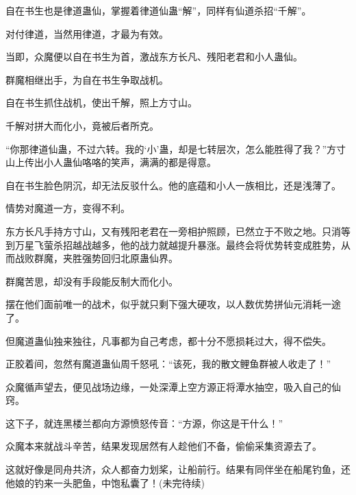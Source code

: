 \begin{this_body}
自在书生也是律道蛊仙，掌握着律道仙蛊“解”，同样有仙道杀招“千解”。

对付律道，当然用律道，才最为有效。

当即，众魔便以自在书生为首，激战东方长凡、残阳老君和小人蛊仙。

群魔相继出手，为自在书生争取战机。

自在书生抓住战机，使出千解，照上方寸山。

千解对拼大而化小，竟被后者所克。

“你那律道仙蛊，不过六转。我的‘小’蛊，却是七转层次，怎么能胜得了我？”方寸山上传出小人蛊仙咯咯的笑声，满满的都是得意。

自在书生脸色阴沉，却无法反驳什么。他的底蕴和小人一族相比，还是浅薄了。

情势对魔道一方，变得不利。

东方长凡手持方寸山，又有残阳老君在一旁相护照顾，已然立于不败之地。只消等到万星飞萤杀招越战越多，他的战力就越提升暴涨。最终会将优势转变成胜势，从而战败群魔，夹胜强势回归北原蛊仙界。

群魔苦思，却没有手段能反制大而化小。

摆在他们面前唯一的战术，似乎就只剩下强大硬攻，以人数优势拼仙元消耗一途了。

但魔道蛊仙独来独往，凡事都为自己考虑，都十分不愿损耗过大，得不偿失。

正胶着间，忽然有魔道蛊仙周千怒吼：“该死，我的散文鲤鱼群被人收走了！”

众魔循声望去，便见战场边缘，一处深潭上空方源正将潭水抽空，吸入自己的仙窍。

这下子，就连黑楼兰都向方源愤怒传音：“方源，你这是干什么！”

众魔本来就战斗辛苦，结果发现居然有人趁他们不备，偷偷采集资源去了。

这就好像是同舟共济，众人都奋力划桨，让船前行。结果有同伴坐在船尾钓鱼，还他娘的钓来一头肥鱼，中饱私囊了！(未完待续)

\end{this_body}

